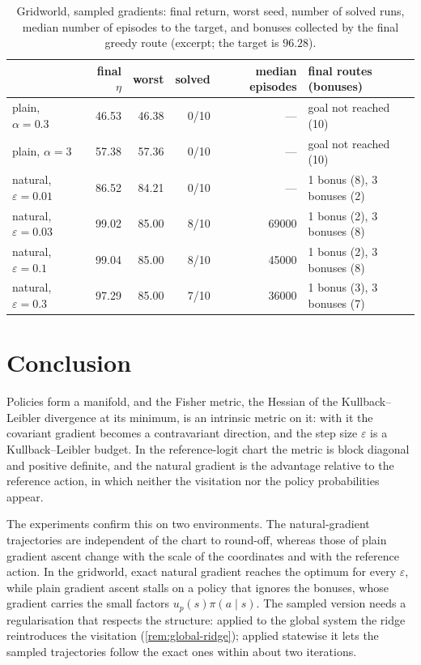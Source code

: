 \documentclass[11pt,a4paper]{article}
\numberwithin{equation}{section}
\theoremstyle{plain}
\theoremstyle{definition}
\theoremstyle{remark}
\begin{document}
\begin{table}[!htbp]
\centering
\small
\begin{tabular}{@{}lrrrrl@{}}
\toprule
 & final $\eta$ & worst & solved & median episodes & final routes (bonuses)\\
\midrule
plain, $\alpha=0.3$ & 46.53 & 46.38 & 0/10 & --- & goal not reached (10)\\
plain, $\alpha=3$ & 57.38 & 57.36 & 0/10 & --- & goal not reached (10)\\
natural, $\varepsilon=0.01$ & 86.52 & 84.21 & 0/10 & --- & 1 bonus (8), 3 bonuses (2)\\
natural, $\varepsilon=0.03$ & 99.02 & 85.00 & 8/10 & 69000 & 1 bonus (2), 3 bonuses (8)\\
natural, $\varepsilon=0.1$ & 99.04 & 85.00 & 8/10 & 45000 & 1 bonus (2), 3 bonuses (8)\\
natural, $\varepsilon=0.3$ & 97.29 & 85.00 & 7/10 & 36000 & 1 bonus (3), 3 bonuses (7)\\
\bottomrule
\end{tabular}
\caption{Gridworld, sampled gradients: final return, worst seed, number of solved runs, median number of episodes to the target, and bonuses collected by the final greedy route (excerpt; the target is $96.28$).}\label{tab:grid-sampled}
\end{table}

\FloatBarrier
\section{Conclusion}\label{sec:conclusion}

Policies form a manifold, and the Fisher metric, the Hessian of the Kullback--Leibler divergence at its minimum, is an intrinsic metric on it: with it the covariant gradient becomes a contravariant direction, and the step size $\varepsilon$ is a Kullback--Leibler budget. In the reference-logit chart the metric is block diagonal and positive definite,
and the natural gradient is the advantage relative to the reference action, in which neither the visitation nor the policy probabilities appear.

The experiments confirm this on two environments. The natural-gradient trajectories are independent of the chart to round-off, whereas those of plain gradient ascent change with the scale of the coordinates and with the reference action. In the gridworld, exact natural gradient reaches the optimum for every $\varepsilon$, while plain gradient ascent
stalls on a policy that ignores the bonuses, whose gradient carries the small factors $u_p(s)\pi(a\mid s)$. The sampled version needs a regularisation that respects the structure: applied to the global system the ridge reintroduces the visitation (\cref{rem:global-ridge}); applied statewise it lets the sampled trajectories follow the exact ones within about two iterations.
\end{document}
